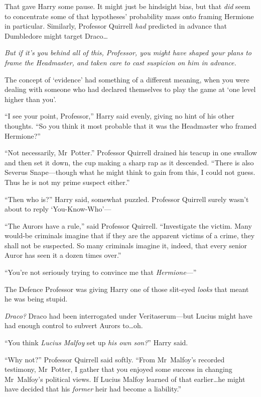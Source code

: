 That gave Harry some pause. It might just be hindsight bias, but that \emph{did} seem to concentrate some of that hypotheses’ probability mass onto framing Hermione in particular. Similarly, Professor Quirrell \emph{had} predicted in advance that Dumbledore might target Draco…

\emph{But if it’s you behind all of this, Professor, you might have shaped your plans to frame the Headmaster, and taken care to cast suspicion on him in advance.}

The concept of ‘evidence’ had something of a different meaning, when you were dealing with someone who had declared themselves to play the game at ‘one level higher than you’.

“I see your point, Professor,” Harry said evenly, giving no hint of his other thoughts. “So you think it most probable that it was the Headmaster who framed Hermione?”

“Not necessarily, Mr~Potter.” Professor Quirrell drained his teacup in one swallow and then set it down, the cup making a sharp rap as it descended. “There is also Severus Snape—though what he might think to gain from this, I could not guess. Thus he is not my prime suspect either.”

“Then who is?” Harry said, somewhat puzzled. Professor Quirrell surely wasn’t about to reply ‘You-Know-Who’—

“The Aurors have a rule,” said Professor Quirrell. “Investigate the victim. Many would-be criminals imagine that if they are the apparent victims of a crime, they shall not be suspected. So many criminals imagine it, indeed, that every senior Auror has seen it a dozen times over.”

“You’re not seriously trying to convince me that \emph{Hermione}—”

The Defence Professor was giving Harry one of those slit-eyed \emph{looks} that meant he was being stupid.

\emph{Draco?} Draco had been interrogated under Veritaserum—but Lucius might have had enough control to subvert Aurors to…oh.

“You think \emph{Lucius Malfoy} set up \emph{his own son?}” Harry said.

“Why not?” Professor Quirrell said softly. “From Mr~Malfoy’s recorded testimony, Mr~Potter, I gather that you enjoyed some success in changing Mr~Malfoy’s political views. If Lucius Malfoy learned of that earlier…he might have decided that his \emph{former} heir had become a liability.”

